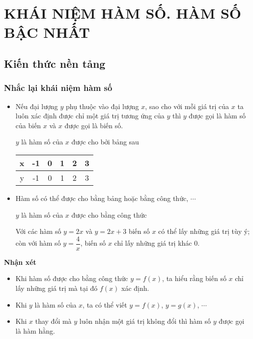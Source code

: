 
\section{KHÁI NIỆM HÀM SỐ. HÀM SỐ BẬC NHẤT}
\subsection{Kiến thức nền tảng}
\subsubsection{Nhắc lại khái niệm hàm số}
\begin{itemize}
	\item Nếu đại lượng $y$ phụ thuộc vào đại lượng $x$, sao cho với mỗi giá trị của $x$ ta luôn xác định được chỉ một giá trị tương ứng của $y$ thì $y$ được gọi là hàm số của biến $x$ và $x$ được gọi là biến số.
	\begin{vd}
		$y$ là hàm số của $x$ được cho bởi bảng sau
		\begin{center}
			\begin{tabular}{ c|c|c|c|c|c} 
				x & -1 & 0 & 1 & 2 & 3 \\ 
				\hline
				y & -1 & 0 & 1 & 2 & 3 
			\end{tabular}
		\end{center}
	\end{vd}
	\item Hàm số có thể được cho bằng bảng hoặc bằng công thức, $\cdots$
	\begin{vd}
		$y$ là hàm số của $x$ được cho bằng công thức
Với các hàm số $y=2x$ và $y=2x+3$ biến số $x$ có thể lấy những giá trị tùy ý; còn với hàm số $y=\dfrac{4}{x}$, biến số $x$ chỉ lấy những giá trị khác $0$.
	\end{vd}
\end{itemize}

\begin{note}{\textbf{Nhận xét}}
	\begin{itemize}
		\item Khi hàm số được cho bằng công thức $ y = f(x)$, ta hiểu rằng biến số $x$ chỉ lấy những giá trị mà tại đó $f(x)$ xác định.
		\item	Khi $y$ là hàm số của $x$, ta có thể viết $y = f(x)$, $y = g(x)$, $\cdots$
		\item	Khi $x$ thay đổi mà $y$ luôn nhận một giá trị không đổi thì hàm số $y$ được gọi là hàm hằng.
	\end{itemize}
\end{note}

